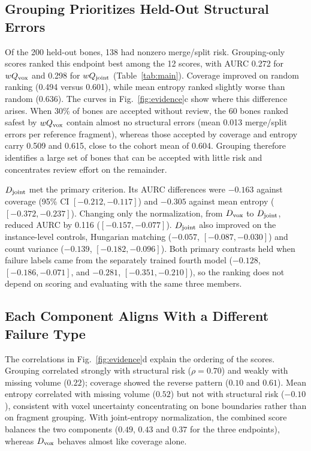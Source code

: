 \documentclass[conference]{IEEEtran}
\begin{document}
\subsection{Grouping Prioritizes Held-Out Structural Errors}
Of the 200 held-out bones, 138 had nonzero merge/split risk. Grouping-only scores ranked this endpoint best among the 12 scores, with AURC 0.272 for $wQ_{\rm vox}$ and 0.298 for $wQ_{\rm joint}$ (Table~\ref{tab:main}). Coverage improved on random ranking (0.494 versus 0.601), while mean entropy ranked slightly worse than random (0.636). The curves in Fig.~\ref{fig:evidence}c show where this difference arises. When 30\% of bones are accepted without review, the 60 bones ranked safest by $wQ_{\rm vox}$ contain almost no structural errors (mean 0.013 merge/split errors per reference fragment), whereas those accepted by coverage and entropy carry 0.509 and 0.615, close to the cohort mean of 0.604. Grouping therefore identifies a large set of bones that can be accepted with little risk and concentrates review effort on the remainder.

$D_{\rm joint}$ met the primary criterion. Its AURC differences were $-0.163$ against coverage (95\% CI $[-0.212,-0.117]$) and $-0.305$ against mean entropy ($[-0.372,-0.237]$). Changing only the normalization, from $D_{\rm vox}$ to $D_{\rm joint}$, reduced AURC by 0.116 ($[-0.157,-0.077]$). $D_{\rm joint}$ also improved on the instance-level controls, Hungarian matching ($-0.057$, $[-0.087,-0.030]$) and count variance ($-0.139$, $[-0.182,-0.096]$). Both primary contrasts held when failure labels came from the separately trained fourth model ($-0.128$, $[-0.186,-0.071]$, and $-0.281$, $[-0.351,-0.210]$), so the ranking does not depend on scoring and evaluating with the same three members.

\subsection{Each Component Aligns With a Different Failure Type}
The correlations in Fig.~\ref{fig:evidence}d explain the ordering of the scores. Grouping correlated strongly with structural risk ($\rho=0.70$) and weakly with missing volume ($0.22$); coverage showed the reverse pattern ($0.10$ and $0.61$). Mean entropy correlated with missing volume ($0.52$) but not with structural risk ($-0.10$), consistent with voxel uncertainty concentrating on bone boundaries rather than on fragment grouping. With joint-entropy normalization, the combined score balances the two components ($0.49$, $0.43$ and $0.37$ for the three endpoints), whereas $D_{\rm vox}$ behaves almost like coverage alone.
\end{document}
